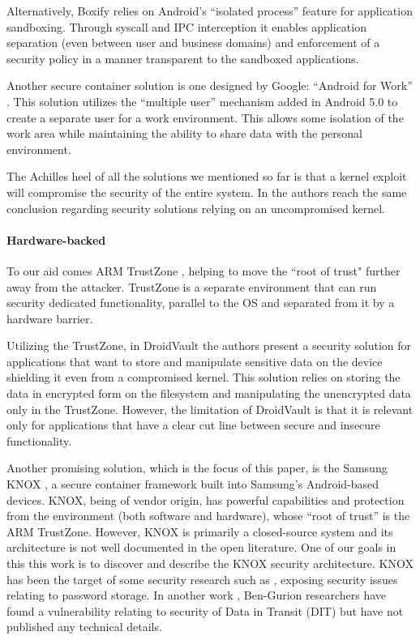 \documentclass[11pt]{article}
\begin{document}
Alternatively, Boxify \cite{Boxify} relies on Android's ``isolated process'' feature for application sandboxing. 
Through syscall and IPC interception it enables application separation (even between user and business domains) 
and enforcement of a security policy in a manner transparent to the sandboxed applications.

Another secure container solution is one designed by Google: ``Android for Work'' \cite{AndroidForWorkSecurityWhitePaper, AReviewOfAndroidForWork}. 
This solution utilizes the ``multiple user'' mechanism added in Android 5.0 to create a separate user for a work environment. 
This allows some isolation of the work area while maintaining the ability to share data with the personal environment.

The Achilles heel of all the solutions we mentioned so far is that a kernel 
exploit will compromise the security of the entire system. In \cite{EvaluationOfSecuritySolutionsForAndroidSystems} the authors reach the 
same conclusion regarding security solutions relying on an uncompromised kernel. 

\paragraph{Hardware-backed}
To our aid comes ARM TrustZone \cite{TrustZoneSecurityWhitepaper}, helping to move the ``root of trust" further away from the attacker. 
TrustZone is a separate environment that can run security dedicated functionality, 
parallel to the OS and separated from it by a hardware barrier. 

Utilizing the TrustZone, in DroidVault \cite{DroidVault} the authors present a security solution for applications that want to store and manipulate 
sensitive data on the device shielding it even from a compromised kernel.
This solution relies on storing the data in encrypted form on the filesystem and manipulating the unencrypted data only in the TrustZone. 
However, the limitation of DroidVault is that it is relevant only for applications that have a clear cut line between secure and insecure functionality.

Another promising solution, which is the focus of this paper, is the Samsung KNOX \cite{SamsungKNOXSecuritySolution}, 
a secure container framework built into Samsung's Android-based devices. 
KNOX, being of vendor origin, has powerful capabilities and protection from the environment (both software and hardware), 
whose ``root of trust'' is the ARM TrustZone. However, KNOX is primarily a closed-source system and its architecture is not well documented in the
open literature. One of our goals in this this work is to discover and describe the KNOX security architecture.
KNOX has been the target of some security research such as \cite{KnoxSecurityResearch2}, exposing security issues relating to password storage.
In another work \cite{KnoxSecurityResearch1}, Ben-Gurion researchers have found a vulnerability relating to security of Data in Transit (DIT) 
but have not published any technical details.
\end{document}
